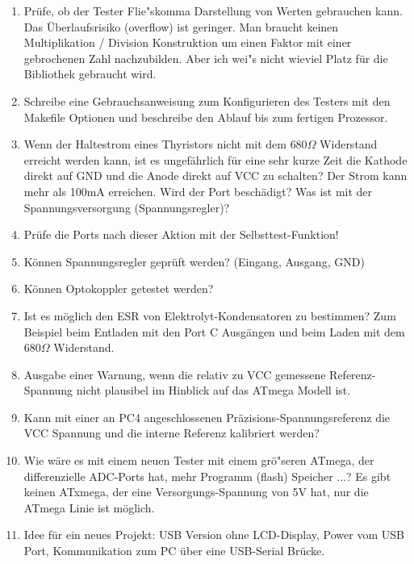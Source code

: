 \begin{enumerate}
\item Pr\"ufe, ob der Tester Flie"skomma Darstellung von Werten gebrauchen kann.
Das \"Uberlaufsrisiko (overflow) ist geringer.
Man braucht keinen Multiplikation / Division Konstruktion um einen Faktor mit einer gebrochenen Zahl nachzubilden.
Aber ich wei"s nicht wieviel Platz f\"ur die Bibliothek gebraucht wird.
\item Schreibe eine Gebrauchsanweisung zum Konfigurieren des Testers mit den Makefile Optionen und beschreibe
den Ablauf bis zum fertigen Prozessor.
\item Wenn der Haltestrom eines Thyristors nicht mit dem \(680\Omega\) Widerstand erreicht werden kann, 
ist es ungef\"ahrlich f\"ur eine sehr kurze Zeit die Kathode direkt auf GND und die Anode direkt auf VCC zu schalten?
Der Strom kann mehr als 100mA erreichen. Wird der Port besch\"adigt? Was ist mit der Spannungsversorgung (Spannungsregler)?
\item Pr\"ufe die Ports nach dieser Aktion mit der Selbsttest-Funktion!
\item K\"onnen Spannungsregler gepr\"uft werden? (Eingang, Ausgang, GND)
\item K\"onnen Optokoppler getestet werden?
\item Ist es m\"oglich den ESR von Elektrolyt-Kondensatoren zu bestimmen? Zum Beispiel beim Entladen mit den Port C Ausg\"angen und beim
Laden mit dem \(680\Omega\) Widerstand.
\item Ausgabe einer Warnung, wenn die relativ zu VCC gemessene Referenz-Spannung nicht plausibel im Hinblick auf das ATmega Modell ist.
\item Kann mit einer an PC4 angeschlossenen Pr\"azisions-Spannungsreferenz die VCC Spannung und die interne Referenz kalibriert werden?
\item Wie w\"are es mit einem neuen Tester mit einem gr\"o"seren ATmega, der differenzielle ADC-Ports hat,
mehr Programm (flash) Speicher ...?
Es gibt keinen ATxmega, der eine Versorgungs-Spannung von 5V hat, nur die ATmega Linie ist m\"oglich.
\item Idee f\"ur ein neues Projekt: USB  Version ohne LCD-Display, Power vom USB Port, Kommunikation zum PC \"uber eine USB-Serial Br\"ucke.
\end{enumerate}
